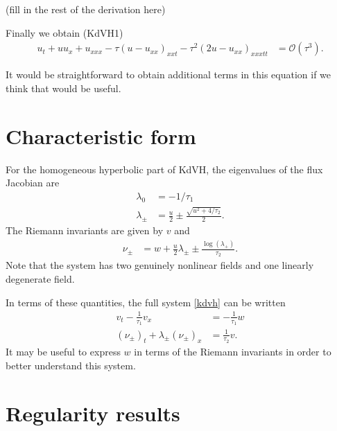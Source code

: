 \documentclass{article}
\theoremstyle{plain}
\theoremstyle{definition}
\numberwithin{theorem}{section}
\newcommand{\order}{{\mathcal O}}
\begin{document}
(fill in the rest of the derivation here)

Finally we obtain (KdVH1)
\begin{align} \label{kdvh1}
    u_t + u u_x + u_{xxx} - \tau\left(u-u_{xx}  \right)_{xxt} - \tau^2\left(2u-u_{xx}\right)_{xxxtt} & = \order(\tau^3).
\end{align}

It would be straightforward to obtain additional terms in this equation if we think that would
be useful.

\section{Characteristic form}
For the homogeneous hyperbolic part of KdVH, the eigenvalues of the flux Jacobian are
\begin{align}
    \lambda_0 & = -1/\tau_1 \\
    \lambda_\pm & = \frac{u}{2} \pm \frac{\sqrt{u^2 +4/\tau_2}}{2}.
\end{align}
The Riemann invariants are given by $v$ and
\begin{align}
\nu_\pm & = w + \frac{u}{2} \lambda_\pm \pm \frac{\log(\lambda_+)}{\tau_2}.
\end{align}
Note that the system has two genuinely nonlinear fields and one linearly
degenerate field.

In terms of these quantities, the full system \eqref{kdvh} can be written
\begin{subequations}
\begin{align}
    v_t - \frac{1}{\tau_1} v_x & = -\frac{1}{\tau_1} w \\
    (\nu_\pm)_t + \lambda_\pm (\nu_\pm)_x & = \frac{1}{\tau_2} v.
\end{align}
\end{subequations}
It may be useful to express $w$ in terms of the Riemann invariants
in order to better understand this system.




\section{Regularity results}
\end{document}
